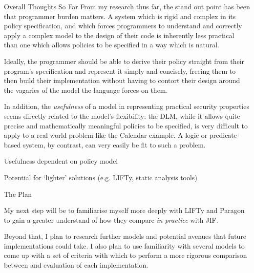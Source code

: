 \begin{frame}{Overall Thoughts So Far}
From my research thus far, the stand out point has been that programmer burden matters. A system which is rigid and complex in its policy specification, and which forces programmers to understand and correctly apply a complex model to the design of their code is inherently less practical than one which allows policies to be specified in a way which is natural.

Ideally, the programmer should be able to derive their policy straight from their program's specification and represent it simply and concisely, freeing them to then build their implementation without having to contort their design around the vagaries of the model the language forces on them.

In addition, the \textit{usefulness} of a model in representing practical security properties seems directly related to the model's flexibility: the DLM, while it allows quite precise and mathematically meaningful policies to be specified, is very difficult to apply to a real world problem like the Calendar example. A logic or predicate-based system, by contrast, can very easily be fit to such a problem.

Usefulness dependent on policy model

Potential for `lighter' solutions (e.g. LIFTy, static analysis tools)
\end{frame}

\begin{frame}{The Plan}

My next step will be to familiarise myself more deeply with LIFTy and Paragon to gain a greater understand of how they compare \textit{in practice} with JIF.

Beyond that, I plan to research further models and potential avenues that future implementations could take. I also plan to use familiarity with several models to come up with a set of criteria with which to perform a more rigorous comparison between and evaluation of each implementation.

\end{frame}
